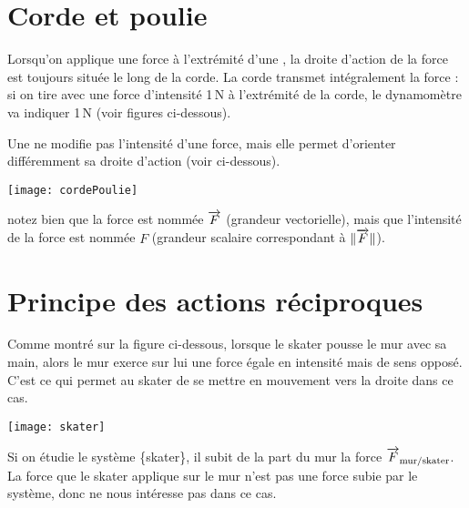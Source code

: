 \section{Corde et poulie}


Lorsqu'on applique une force à l'extrémité d'une \textbf{}, la droite d'action de la force est toujours située le long de la corde. La corde transmet intégralement la force : si on tire avec une force d'intensité 1\,N à l'extrémité de la corde, le dynamomètre va indiquer 1\,N (voir figures ci-dessous).


Une \textbf{} ne modifie pas l'intensité d'une force, mais elle permet d'orienter différemment sa droite d'action (voir ci-dessous).

\vspace{1em}

\begin{center}
    \texttt{[image: cordePoulie]}
\end{center}

\vspace{2em}

\begin{remarque}
notez bien que la force est nommée $\overrightarrow{F}$ (grandeur vectorielle), mais que l'intensité de la force est nommée $F$ (grandeur scalaire correspondant à $\lVert\overrightarrow{F}\rVert$).
\end{remarque}





\section{Principe des actions réciproques}

Comme montré sur la figure ci-dessous, lorsque le skater pousse le mur avec sa main, alors le mur exerce sur lui une force égale en intensité mais de sens opposé. C'est ce qui permet au skater de se mettre en mouvement vers la droite dans ce cas.

\begin{center}
    \texttt{[image: skater]}
\end{center}


Si on étudie le système \{skater\}, il subit de la part du mur la force $\overrightarrow{F}_\text{mur/skater}$. La force que le skater applique sur le mur n'est pas une force subie par le système, donc ne nous intéresse pas dans ce cas. 

